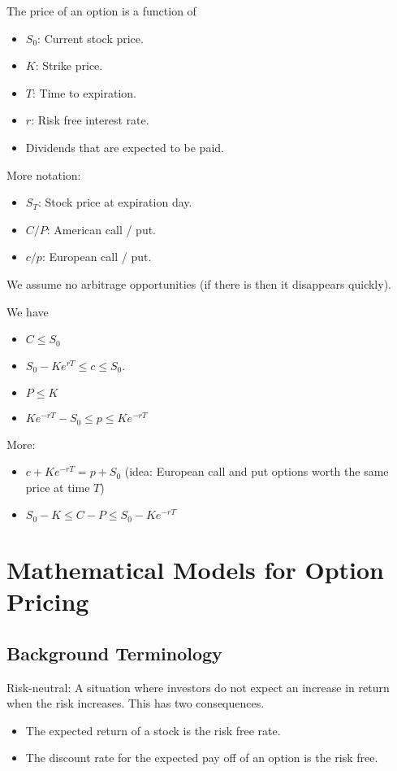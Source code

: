 \documentclass[a4paper]{article}
\begin{document}
The price of an option is a function of 
\begin{itemize}
\item $S_0$: Current stock price. 
\item $K$: Strike price. 
\item $T$: Time to expiration. 
\item $r$: Risk free interest rate. 
\item Dividends that are expected to be paid. 
\end{itemize}
More notation: 
\begin{itemize}
\item $S_T$: Stock price at expiration day. 
\item $C/P$: American call / put. 
\item $c/p$: European call / put. 
\end{itemize}

We assume no arbitrage opportunities (if there is then it disappears quickly). 

We have 
\begin{itemize}
\item $C\leq S_0$
\item $S_0-Ke^{rT}\leq c\leq S_0$. 
\item $P\leq K$
\item $Ke^{-rT}-S_0\leq p\leq Ke^{-rT}$
\end{itemize}

More:
\begin{itemize}
\item $c+Ke^{-rT}=p+S_0$ (idea: European call and put options worth the same price at time $T$)
\item $S_0-K\leq C-P\leq S_0-Ke^{-rT}$
\end{itemize}



\pagebreak
\section{Mathematical Models for Option Pricing}
\subsection{Background Terminology}
Risk-neutral: A situation where investors do not expect an increase in return when the risk increases. This has two consequences. 
\begin{itemize}
\item The expected return of a stock is the risk free rate. 
\item The discount rate for the expected pay off of an option is the risk free. 
\end{itemize}
\end{document}
